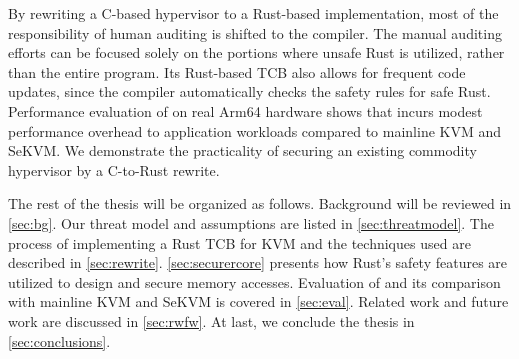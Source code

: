 

By rewriting a C-based hypervisor to a Rust-based implementation,
most of the responsibility of human auditing is shifted to the compiler.
The manual auditing efforts can be focused solely on the
portions where unsafe Rust is utilized, rather than the entire program.
Its Rust-based TCB also allows for frequent code updates, since the compiler
automatically checks the safety rules for safe Rust.
Performance evaluation of \rustsec{} on real Arm64 hardware shows that
\rustsec{} incurs modest performance overhead to application workloads
compared to mainline KVM and SeKVM. We demonstrate the practicality of
securing an existing commodity hypervisor by a C-to-Rust rewrite.

The rest of the thesis will be organized as follows. Background
will be reviewed in \autoref{sec:bg}. Our threat model and assumptions are
listed in \autoref{sec:threatmodel}. The process of implementing a Rust TCB
for KVM and the techniques used are described in \autoref{sec:rewrite}.
\autoref{sec:securercore} presents how Rust's safety features are utilized to
design and secure \rustcore{} memory accesses.
Evaluation of \rustsec{} and its comparison with mainline KVM and SeKVM is
covered in \autoref{sec:eval}. Related work and future work are discussed in
\autoref{sec:rwfw}. At last, we conclude the thesis in
\autoref{sec:conclusions}.
